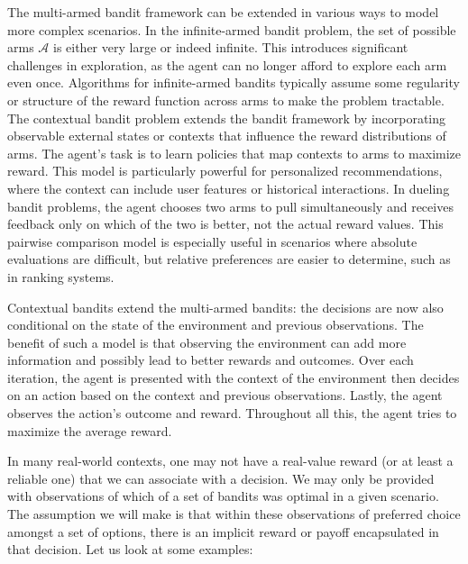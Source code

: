 \documentclass[
  letterpaper,
  DIV=11,
  numbers=noendperiod,
  oneside]{scrreprt}
\theoremstyle{remark}
\begin{document}
The multi-armed bandit framework can be extended in various ways to
model more complex scenarios. In the infinite-armed bandit problem, the
set of possible arms \(\mathcal{A}\) is either very large or indeed
infinite. This introduces significant challenges in exploration, as the
agent can no longer afford to explore each arm even once. Algorithms for
infinite-armed bandits typically assume some regularity or structure of
the reward function across arms to make the problem tractable. The
contextual bandit problem extends the bandit framework by incorporating
observable external states or contexts that influence the reward
distributions of arms. The agent's task is to learn policies that map
contexts to arms to maximize reward. This model is particularly powerful
for personalized recommendations, where the context can include user
features or historical interactions. In dueling bandit problems, the
agent chooses two arms to pull simultaneously and receives feedback only
on which of the two is better, not the actual reward values. This
pairwise comparison model is especially useful in scenarios where
absolute evaluations are difficult, but relative preferences are easier
to determine, such as in ranking systems.

Contextual bandits extend the multi-armed bandits: the decisions are now
also conditional on the state of the environment and previous
observations. The benefit of such a model is that observing the
environment can add more information and possibly lead to better rewards
and outcomes. Over each iteration, the agent is presented with the
context of the environment then decides on an action based on the
context and previous observations. Lastly, the agent observes the
action's outcome and reward. Throughout all this, the agent tries to
maximize the average reward.

In many real-world contexts, one may not have a real-value reward (or at
least a reliable one) that we can associate with a decision. We may only
be provided with observations of which of a set of bandits was optimal
in a given scenario. The assumption we will make is that within these
observations of preferred choice amongst a set of options, there is an
implicit reward or payoff encapsulated in that decision. Let us look at
some examples:
\end{document}
